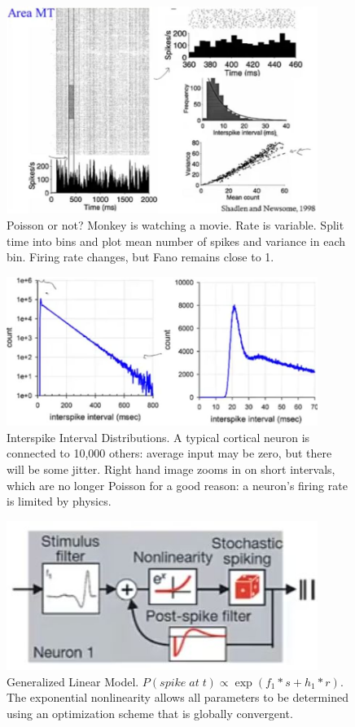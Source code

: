 \documentclass[]{article}
\begin{document}
\begin{figure}[H]
	\caption[Poisson or not?]{Poisson or not? Monkey is watching a movie. Rate is variable. Split time into bins and plot mean number of spikes and variance in each bin. Firing rate changes, but Fano remains close to 1.}
	\includegraphics[width=0.9\textwidth]{poisson-or-not}
\end{figure}

\begin{figure}[H]
	\caption[Interspike Interval Distributions]{Interspike Interval Distributions. A typical cortical neuron is connected to 10,000 others: average input may be zero, but there will be some jitter. Right hand image zooms in on short intervals, which are no longer Poisson for a good reason: a neuron's firing rate is limited by physics.}
	\includegraphics[width=0.9\textwidth]{interspike-intervals}
\end{figure}

\begin{figure}[H]
	\caption[Generalized Linear Model]{Generalized Linear Model\cite{pillow2008spatio}. $P(spike\;at\;t) \propto \exp(f_1*s + h_1*r)$. The exponential nonlinearity allows all parameters to be determined using an optimization scheme that is globally convergent.}
	\includegraphics[width=0.9\textwidth]{generalized-linear-model}
\end{figure}
\end{document}
